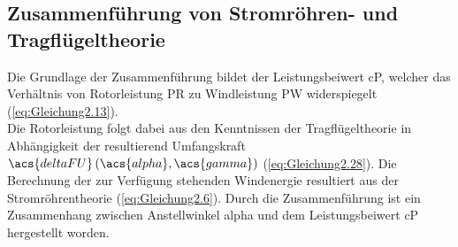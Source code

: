 \subsection{Zusammenführung von Stromröhren- und Tragflügeltheorie}
Die Grundlage der Zusammenführung bildet der Leistungsbeiwert \acs{cP}, welcher das Verhältnis von Rotorleistung \acs{PR} zu Windleistung \acs{PW} widerspiegelt (\autoref{eq:Gleichung2.13}).\\
Die Rotorleistung folgt dabei aus den Kenntnissen der Tragflügeltheorie in Abhängigkeit der resultierend Umfangskraft $\acs{deltaFU}\left(\acs{alpha}, \acs{gamma}\right)$ (\autoref{eq:Gleichung2.28}). Die Berechnung der zur Verfügung stehenden Windenergie resultiert aus der Stromröhrentheorie (\autoref{eq:Gleichung2.6}). Durch die Zusammenführung ist ein Zusammenhang zwischen Anstellwinkel \acs{alpha} und dem Leistungsbeiwert \acs{cP} hergestellt worden.

